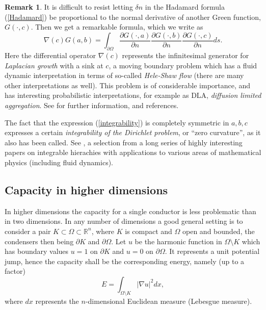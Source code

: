 \documentclass[reqno,12pt]{article}
\theoremstyle{plain}
\theoremstyle{definition}
\newtheorem{remark}[defn]{Remark}
\numberwithin{equation}{section}
\numberwithin{figure}{section}
\def\R{{\mathbb R}}
\begin{document}
\begin{remark}\label{rem:Laplacian growth}
It is difficult to resist letting $\delta n$ in the Hadamard formula (\ref{Hadamard})
be proportional to the normal derivative of another Green function, $G(\cdot,c)$. 
Then we get a remarkable formula, which we write as
\begin{equation}\label{integrability}
\nabla(c) G(a,b)= \int_{\partial \Omega}\frac{\partial G(\cdot,a)}{\partial n}
\frac{\partial G(\cdot,b)}{\partial n} \frac{\partial G(\cdot,c)}{\partial n} ds.
\end{equation}
Here the differential operator $\nabla(c)$ represents the infinitesimal generator for {\it Laplacian growth} with a 
sink at $c$, 
a moving boundary  problem which has a fluid dynamic interpretation in terms of so-called {\it Hele-Shaw flow} 
(there are many other interpretations as well). This problem is of considerable importance,
and has interesting probabilistic interpretations, for example as DLA, {\it diffusion limited aggregation}.
See \cite{Gustafsson-Teodorescu-Vasiliev-2014} for further information, and references.

The fact that the expression (\ref{integrability}) is completely symmetric in $a,b,c$ expresses a certain {\it integrability
of the Dirichlet problem}, or ``zero curvature'', as it also has been called.
See \cite{Mineev-1990, Wiegmann-Zabrodin-2000, Kostov-Krichever-Mineev-Wiegmann-Zabrodin-2001, 
Krichever-Marshakov-Zabrodin-2005, Alekseev-Mineev-2017}, a selection from a long series of
highly interesting papers on integrable hierachies with applications to various areas of mathematical physics
(including fluid dynamics).
\end{remark}


\subsection{Capacity in higher dimensions}\label{sec:capacityRn}

In higher dimensions the capacity for a single conductor is less problematic than in two dimensions.
In any number of dimensions a good general setting is to consider a pair
$K\subset \Omega\subset\R^n$, where $K$ is compact and $\Omega$ open and bounded,
the condensers then being $\partial K$ and $\partial \Omega$. 
Let $u$ be the harmonic function  in $\Omega\setminus K$ which has boundary values $u=1$
on $\partial K$ and $u=0$ on $\partial \Omega$. 
It represents a unit potential jump, hence the capacity shall be the corresponding 
energy, namely (up to a factor) 
\begin{equation}\label{Enablau}
E=\int_{\Omega\setminus K}|\nabla u|^2 dx,
\end{equation}
where $dx$ represents the $n$-dimensional Euclidean measure (Lebesgue measure).
\end{document}
